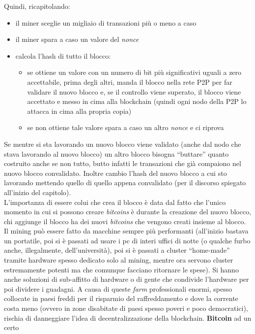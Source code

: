 \documentclass[a4paper,12pt, oneside]{book}
\begin{document}
Quindi, ricapitolando:
\begin{itemize}
  \item il miner sceglie un migliaio di transazioni più o meno a caso
  \item il miner spara a caso un valore del \textit{nonce} 
  \item calcola l'hash di tutto il blocco:
  \begin{itemize}
    \item  se ottiene un valore con un numero di bit più significativi uguali a
    zero accettabile, prima degli altri, manda il blocco nella rete P2P per far
    validare il nuovo blocco e, se il controllo viene superato, il blocco viene
    accettato e messo in cima alla blockchain (quindi ogni nodo della P2P lo
    attacca in cima alla propria copia)
    \item se non ottiene tale valore spara a caso un altro \textit{nonce} e ci
    riprova
  \end{itemize}
\end{itemize}
Se mentre si sta lavorando un nuovo blocco viene validato (anche dal nodo che
stava lavorando al nuovo blocco) un altro blocco bisogna ``buttare'' quanto
costruito anche se non tutto, butto infatti le transazioni che già compaiono nel
nuovo blocco convalidato. Inoltre cambio l'hash del nuovo blocco a cui sto
lavorando mettendo quello di quello appena convalidato (per il discorso spiegato
all'inizio del capitolo).\\
L'importanza di essere colui che crea il blocco è data dal fatto che l'unico
momento in cui si possono creare \textit{bitcoins} è durante la creazione del
nuovo blocco, chi aggiunge il blocco ha dei nuovi \textit{bitcoins} che vengono
creati insieme al blocco.\\
Il mining può essere fatto da macchine sempre più performanti (all'inizio
bastava un portatile, poi si è passati ad usare i pc di interi uffici di notte
(o qualche furbo anche, illegalmente, dell'università), poi si è passati a
cluster ``home-made'' tramite hardware spesso dedicato solo al mining, mentre
ora servono cluster estremamente potenti ma che comunque facciano ritornare le
spese). Si hanno anche soluzioni di sub-affitto di hardware o di gente che
condivide l'hardware per poi dividere i guadagni. A causa di queste
\textit{farm} professionali enormi, spesso collocate in paesi freddi per il
risparmio del raffreddamento e dove la corrente costa meno (ovvero in zone
disabitate di paesi spesso poveri e poco democratici), rischia di danneggiare
l'idea di decentralizzazione della blockchain. \textbf{Bitcoin} ad un certo
\end{document}
